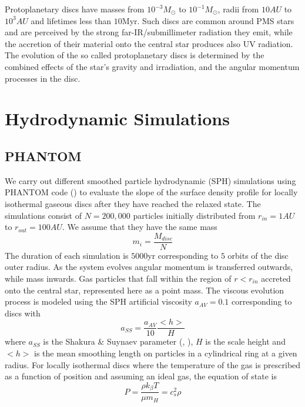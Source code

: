 \documentclass[aps,prb,twocolumn,superscriptaddress,floatfix,longbibliography]{revtex4-2}
\newcounter{para}
\begin{document}
Protoplanetary discs have masses from $10^{-3}M_{\odot}$ to $10^{-1}M_{\odot}$, radii from $10 AU$ to $10^{3}AU$ and lifetimes less than $10$Myr. Such discs are common around PMS stars and are perceived by the strong far-IR/submillimeter radiation they emit, while the accretion of their material onto the central star produces also UV radiation. The evolution of the so called protoplanetary discs is determined by the combined effects of the star's gravity and irradiation, and the angular momentum processes in the disc.

\section{Hydrodynamic Simulations}
\subsection{PHANTOM}
We carry out different smoothed particle hydrodynamic (SPH) simulations using PHANTOM code (\cite{price2018phantom}) to evaluate the slope of the surface density profile for locally isothermal gaseous discs after they have reached the relaxed state. The simulations consist of $N = 200,000$ particles initially distributed from $r_{in} = 1 AU$ to $r_{out} = 100 AU$. We assume that they have the same mass
\begin{equation}\label{eq:particle mass}
    m_i = \frac{M_{disc}}{N}
\end{equation}
The duration of each simulation is $5000$yr corresponding to $5$ orbits of the disc outer radius.  As the system evolves angular momentum is transferred outwards, while mass inwards. Gas particles that fall within the region of $r <r_{in}$ accreted onto the central star, represented here as a point mass. The viscous evolution process is modeled using the SPH artificial viscosity $a_{AV}=0.1$ corresponding to discs with
\begin{equation}\label{eq:artificial viscosity}
    a_{SS} = \frac{a_{AV}}{10} \frac{<h>}{H}
\end{equation}
where $a_{SS}$ is the Shakura \& Suynaev parameter (\cite{shakura1973black}, \cite{lodato2011smoothed}), $H$ is the scale height and $<h>$ is the mean smoothing length on particles in a cylindrical ring at a given radius. For locally isothermal discs where the temperature of the gas is prescribed as a function of position and assuming an ideal gas, the equation of state is
\begin{equation}\label{eq:equation of state}
    P = \frac{\rho k_{\beta}T}{\mu m_H} = c_s^2 \rho
\end{equation}
\end{document}
